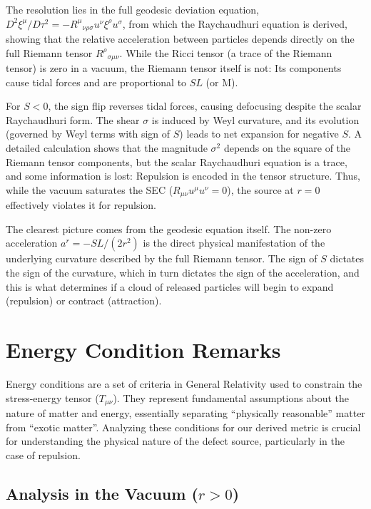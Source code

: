 \documentclass[%
  reprint,
  superscriptaddress,
  showpacs,
  showkeys,
  amsmath,amssymb,
  pra,
  longbibliography,
  floatfix,
]{revtex4-2}
\begin{document}
The resolution lies in the full geodesic deviation equation, $D^2 \xi^\mu / D\tau^2 = - R^\mu{}_{\nu\rho\sigma} u^\nu \xi^\rho u^\sigma$, from which the Raychaudhuri equation is derived, showing that the relative acceleration between particles depends directly on the full Riemann tensor $R^\rho{}_{\sigma\mu\nu}$. While the Ricci tensor (a trace of the Riemann tensor) is zero in a vacuum, the Riemann tensor itself is not: Its components cause tidal forces and are proportional to $S L$ (or M).

For $S<0$, the sign flip reverses tidal forces, causing defocusing despite the scalar Raychaudhuri form. The shear $\sigma$ is induced by Weyl curvature, and its evolution (governed by Weyl terms with sign of $S$) leads to net expansion for negative $S$. A detailed calculation shows that the magnitude $\sigma^2$ depends on the square of the Riemann tensor components, but the scalar Raychaudhuri equation is a trace, and some information is lost: Repulsion is encoded in the tensor structure. Thus, while the vacuum saturates the SEC ($R_{\mu\nu} u^\mu u^\nu =0$), the source at $r=0$ effectively violates it for repulsion.

The clearest picture comes from the geodesic equation itself. The non-zero acceleration $a^r = -SL/(2r^2)$ is the direct physical manifestation of the underlying curvature described by the full Riemann tensor. The sign of $S$ dictates the sign of the curvature, which in turn dictates the sign of the acceleration, and this is what determines if a cloud of released particles will begin to expand (repulsion) or contract (attraction).

\section{Energy Condition Remarks}
\label{sec:energy}

Energy conditions are a set of criteria in General Relativity used to constrain the stress-energy tensor ($T_{\mu\nu}$). They represent fundamental assumptions about the nature of matter and energy, essentially separating ``physically reasonable'' matter from ``exotic matter''. Analyzing these conditions for our derived metric is crucial for understanding the physical nature of the defect source, particularly in the case of repulsion.

\subsection{Analysis in the Vacuum ($r > 0$)}
\end{document}
